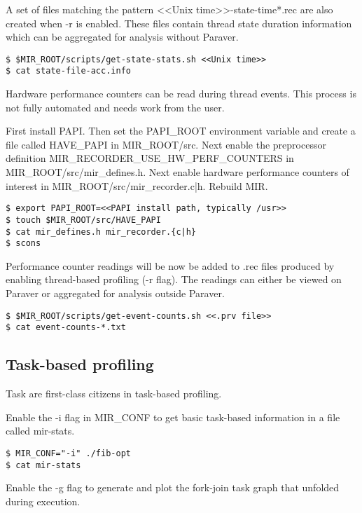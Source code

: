 \documentclass[11pt,a4paper,notitlepage]{article}
\begin{document}
A set of files matching the pattern <<Unix time>>-state-time*.rec are also created when -r is enabled. 
These files contain thread state duration information which can be aggregated for analysis without Paraver.

\begin{lstlisting}[style=BashInputStyle]
$ $MIR_ROOT/scripts/get-state-stats.sh <<Unix time>>
$ cat state-file-acc.info
\end{lstlisting}

Hardware performance counters can be read during thread events. This process is not fully automated and needs work from the user.

First install PAPI. 
Then set the PAPI\_ROOT environment variable and create a file called HAVE\_PAPI in MIR\_ROOT/src.
Next enable the preprocessor definition MIR\_RECORDER\_USE\_HW\_PERF\_COUNTERS in MIR\_ROOT/src/mir\_defines.h.
Next enable hardware performance counters of interest in MIR\_ROOT/src/mir\_recorder.{c|h}.
Rebuild MIR.

\begin{lstlisting}[style=BashInputStyle]
$ export PAPI_ROOT=<<PAPI install path, typically /usr>>
$ touch $MIR_ROOT/src/HAVE_PAPI
$ cat mir_defines.h mir_recorder.{c|h}
$ scons
\end{lstlisting}

Performance counter readings will be now be added to .rec files produced by enabling thread-based profiling (-r flag). 
The readings can either be viewed on Paraver or aggregated for analysis outside Paraver. 

\begin{lstlisting}[style=BashInputStyle]
$ $MIR_ROOT/scripts/get-event-counts.sh <<.prv file>>
$ cat event-counts-*.txt
\end{lstlisting}

\subsection{Task-based profiling}
Task are first-class citizens in task-based profiling.

Enable the -i flag in MIR\_CONF to get basic task-based information in a file called mir-stats.

\begin{lstlisting}[style=BashInputStyle]
$ MIR_CONF="-i" ./fib-opt
$ cat mir-stats
\end{lstlisting}

Enable the -g flag to generate and plot the fork-join task graph that unfolded during execution.
\end{document}
